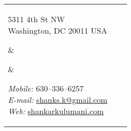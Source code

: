 \newlength{\rcollength}\setlength{\rcollength}{1.8in}%
\newlength{\spacewidth}\setlength{\spacewidth}{20pt}
{}
\begin{tabular}[t]{@{}p{\textwidth-\rcollength-\spacewidth}@{}p{\spacewidth}@{}p{\rcollength}}%

\parbox{\textwidth-\rcollength-\spacewidth}{%
5311 4th St NW\\
Washington, DC 20011 USA}
&
\parbox[m][2\baselineskip]{\spacewidth}{} &

\parbox{\rcollength}{%
\textit{Mobile:} 630--336--6257 \\
\textit{E-mail:} \href{mailto:shanks.k@gmail.com}{shanks.k@gmail.com} \\
\textit{Web: } \href{https://shankarkulumani.com}{shankarkulumani.com}}

\end{tabular}
